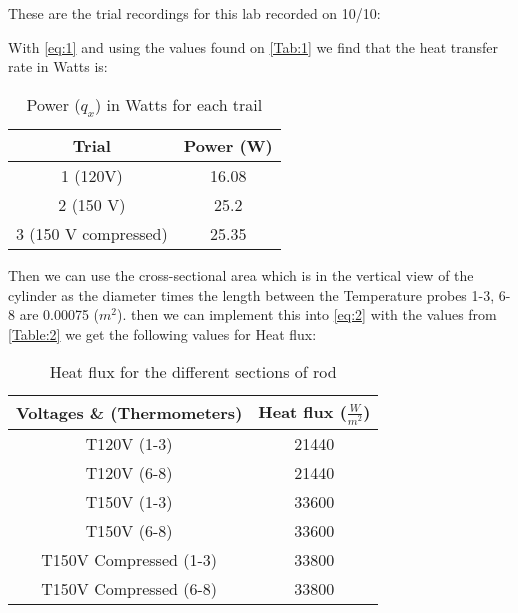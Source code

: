 \documentclass[10pt,twocolumn]{article}
\begin{document}
These are the trial recordings for this lab recorded on 10/10:

\begin{table}[H]
\centering
\caption{Heat Transfer Lab Trial Recording}

\label{Tab:1}
\end{table}



With \autoref{eq:1} and using the values found on \autoref{Tab:1} we find that the heat transfer rate in Watts is:

\begin{table}[H]
\centering
\caption{Power ($q_x$) in Watts for each trail}
\begin{tabular}{|c|c|}
\hline
\textbf{Trial} & \textbf{Power (W)}\\
\hline
1 (120V) & 16.08 \\
\hline
2 (150 V) & 25.2 \\
\hline
3 (150 V compressed) & 25.35 \\
\hline
\end{tabular}
\label{Table:2}

\end{table}

Then we can use the cross-sectional area which is in the vertical view of the cylinder as the diameter times the length between the Temperature probes 1-3, 6-8 are 0.00075 ($m^2$). then we can implement this into \autoref{eq:2} with the values from \autoref{Table:2} we get the following values for Heat flux:

\begin{table}[H]
\centering
\caption{Heat flux for the different sections of rod}
\begin{tabular}{|c|c|}
\hline
\textbf{Voltages \& (Thermometers)} & \textbf{Heat flux ($\frac{W}{m^2}$)} \\
\hline
T120V (1-3) & 21440 \\
\hline
T120V (6-8) & 21440 \\
\hline
T150V (1-3) & 33600 \\
\hline
T150V (6-8) & 33600 \\
\hline
T150V Compressed (1-3) & 33800 \\
\hline
T150V Compressed (6-8) & 33800 \\
\hline
\end{tabular}
\label{table:3}

\end{table}
\end{document}
